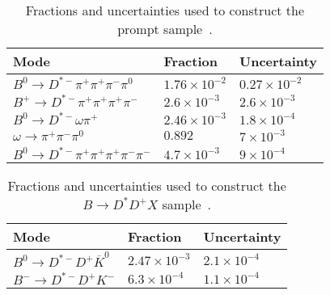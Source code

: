 
  
{
\renewcommand{\arraystretch}{1.25}
 \begin{table}
\centering
\scriptsize
\begin{tabular}{l | l | l }
Mode & Fraction & Uncertainty \\
\hline
$B^{0} \rightarrow D^{*-} \pi^{+} \pi^{+} \pi^{-} \pi^{0}$ &   $1.76 \times 10^{-2}$&$0.27\times 10^{-2}$\\\hline
$B^{+} \rightarrow D^{*-} \pi^{+} \pi^{+} \pi^{+} \pi^{-}$ &    $2.6 \times 10^{-3}$& $2.6\times 10^{-3}$\\\hline

$B^{0} \rightarrow D^{*-} \omega \pi^{+}$  & $2.46 \times 10^{-3}$  &$1.8 \times 10^{-4}$  \\
 $\omega \rightarrow \pi^{+} \pi^{-} \pi^{0}$ & $0.892$  & $7\times 10^{-3}$ \\\hline

$B^{0} \rightarrow D^{*-} \pi^{+} \pi^{+} \pi^{+} \pi^{-} \pi^{-}$ & $4.7 \times 10^{-3}$ & $9 \times 10^{-4}$ \\

\end{tabular}
\caption{Fractions and uncertainties used to construct the prompt sample~\cite{PhysRevD.98.030001}.}
\label{tab:Ds_bkg_modes}
\end{table}
    }
    

    
    
    
{
\renewcommand{\arraystretch}{1.25}
 \begin{table}
\centering
\scriptsize
\begin{tabular}{l | l | l }
Mode & Fraction & Uncertainty \\
\hline
$B^{0} \rightarrow D^{*-} D^{+} \overline{K}^{0}$ & $2.47\times10^{-3}$  & $2.1\times 10^{-4}$\\\hline
$B^{-} \rightarrow D^{*-} D^{+} K^-$ &  $6.3 \times10^{-4}$  & $1.1 \times 10^{-4}$\\

\end{tabular}
\caption{Fractions and uncertainties used to construct the $B \rightarrow D^{*} D^{+} X$ sample~\cite{PhysRevD.98.030001}.}
\label{tab:Ds_bkg_modes}
\end{table}
    }
    

  
  
    
    
